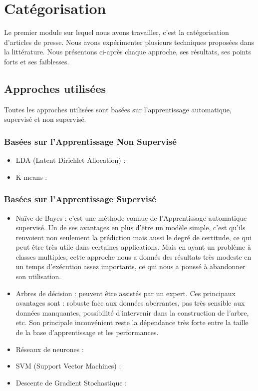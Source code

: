\section{Catégorisation}
    Le premier module sur lequel nous avons travailler, c'est la catégorisation d'articles de presse. Nous avons expérimenter plusieurs techniques proposées dans la littérature. Nous présentons ci-après chaque approche, ses résultats, ses points forts et ses faiblesses.
    \subsection{Approches utilisées\label{approches}}
        Toutes les approches utilisées sont basées sur l'apprentissage automatique, supervisé et non supervisé. 
        \subsubsection{Basées sur l'Apprentissage Non Supervisé}
            \begin{itemize}
                \item{LDA (Latent Dirichlet Allocation) : }
                \item{K-means : }
            \end{itemize}

        \subsubsection{Basées sur l'Apprentissage Supervisé}
            \begin{itemize}
                \item{Naïve de Bayes : }
                c'est une méthode connue de l'Apprentissage automatique supervisé. Un de ses avantages en plus d'être un modèle simple, c'est qu'ils renvoient non seulement la prédiction mais aussi le degré de certitude, ce qui peut être très utile dans certaines applications. Mais en ayant un problème à classes multiples, cette approche nous a donnés des résultats très modeste en un temps d'exécution assez importants, ce qui nous a poussé à abandonner son utilisation.\\

                \item{Arbres de décision : }
                peuvent être assistés par un expert. Ces principaux avantages sont : robuste face aux données aberrantes, pas très sensible aux données manquantes, possibilité d’intervenir dans la construction de l’arbre, etc. Son principale inconvénient reste la dépendance très forte entre la taille de la base d’apprentissage et les performances.\\

                \item{Réseaux de neurones : }
                \item{SVM (Support Vector Machines) : }
                \item{Descente de Gradient Stochastique : }
            \end{itemize}
                
